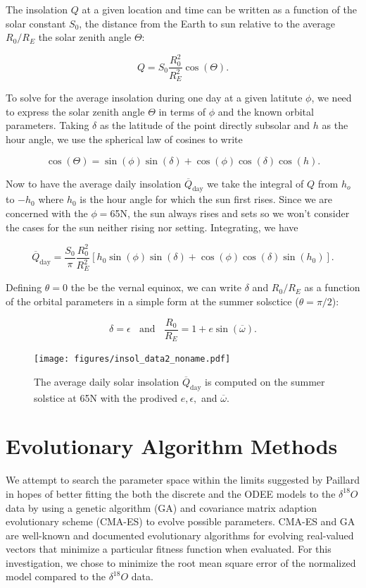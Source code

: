 The insolation $Q$ at a given location and time can be written as a function of the solar constant $S_0$, the distance from the Earth to sun relative to the average $R_0/R_E$ the solar zenith angle $\Theta$:

$$ Q = S_0 \frac{R_0^2}{R_E^2} \cos (\Theta) .$$

To solve for the average insolation during one day at a given latitute $\phi$, we need to express the solar zenith angle $\Theta$ in terms of $\phi$ and the known orbital parameters.
Taking $\delta$ as the latitude of the point directly subsolar and $h$ as the hour angle, we use the spherical law of cosines to write

$$ \cos ( \Theta ) = \sin ( \phi ) \sin ( \delta ) + \cos ( \phi ) \cos ( \delta ) \cos ( h ) .$$

Now to have the average daily insolation $\overline{Q} _\text{day}$ we take the integral of $Q$ from $h_o $ to $-h_0$ where $h_0$ is the hour angle for which the sun first rises.
Since we are concerned with the $\phi = $65N, the sun always rises and sets so we won't consider the cases for the sun neither rising nor setting.
Integrating, we have

$$ \overline{Q} _\text{day} = \frac{S_0}{\pi } \frac{R_0^2}{R_E^2} \left [ h_0 \sin (\phi) \sin (\delta) + \cos (\phi) \cos (\delta) \sin (h_0) \right ] . $$

Defining $\theta = 0$ the be the vernal equinox, we can write $\delta$ and $R_0/R_E$ as a function of the orbital parameters in a simple form at the summer solsctice ($\theta = \pi /2$):

$$ \delta = \epsilon ~~~~\text{and} ~~~~ \frac{R_0}{R_E} = 1 + e\sin (\overline {\omega}) .$$

\begin{figure}[tpb!]
\centering
  \texttt{[image: figures/insol\_data2\_noname.pdf]}
  \caption{
    The average daily solar insolation $\overline{Q}_{\text{day}}$ is computed on the summer solstice at 65N with the prodived $e,\epsilon,$ and $\overline{\omega}$.
  }
  \label{fig:insol-data}
\end{figure}


\section{Evolutionary Algorithm Methods}

\newcommand{\bb}[1]{\mathbb{#1}}
\newcommand{\DO}{$\delta^{18}O$ }

We attempt to search the parameter space within the limits suggested by Paillard \cite{paillard1998timing} in hopes of better fitting the both the discrete and the ODEE models to the \DO data by using a genetic algorithm (GA) and covariance matrix adaption evolutionary scheme (CMA-ES) to evolve possible parameters. CMA-ES and GA are well-known and documented evolutionary algorithms for evolving real-valued vectors that minimize a particular fitness function when evaluated.
For this investigation, we chose to minimize the root mean square error of the normalized model compared to the \DO data.


